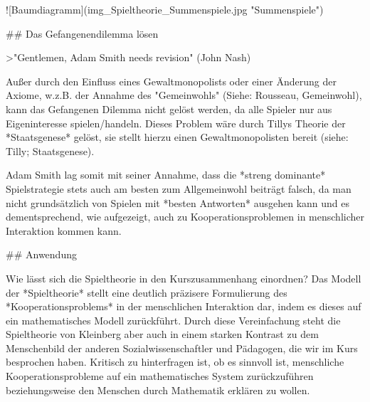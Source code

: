 ![Baumdiagramm](img\Kleinberg_Spieltheorie_Summenspiele.jpg "Summenspiele")

## Das Gefangenendilemma lösen

>"Gentlemen, Adam Smith needs revision" (John Nash)

Außer durch den Einfluss eines Gewaltmonopolists oder einer Änderung der Axiome, w.z.B. der Annahme des "Gemeinwohls" (Siehe: Rousseau, Gemeinwohl), kann das Gefangenen Dilemma nicht gelöst werden, da alle Spieler nur aus Eigeninteresse spielen/handeln.
Dieses Problem wäre durch Tillys Theorie der *Staatsgenese* gelöst, sie stellt hierzu einen Gewaltmonopolisten bereit (siehe: Tilly; Staatsgenese).

Adam Smith lag somit mit seiner Annahme, dass die *streng dominante* Spielstrategie stets auch am besten zum Allgemeinwohl beiträgt falsch, da man nicht grundsätzlich von Spielen mit *besten Antworten* ausgehen kann und es dementsprechend, wie aufgezeigt, auch zu Kooperationsproblemen in menschlicher Interaktion kommen kann.

## Anwendung

Wie lässt sich die Spieltheorie in den Kurszusammenhang einordnen?
Das Modell der *Spieltheorie*   stellt eine deutlich präzisere Formulierung des *Kooperationsproblems* in der menschlichen Interaktion dar, indem es dieses auf ein mathematisches Modell zurückführt.
Durch diese Vereinfachung steht die Spieltheorie von Kleinberg aber auch in einem starken Kontrast zu dem Menschenbild der anderen Sozialwissenschaftler und Pädagogen, die wir im Kurs besprochen haben.
Kritisch zu hinterfragen ist, ob es sinnvoll ist, menschliche Kooperationsprobleme auf ein mathematisches System zurückzuführen beziehungsweise den Menschen durch Mathematik erklären zu wollen.
